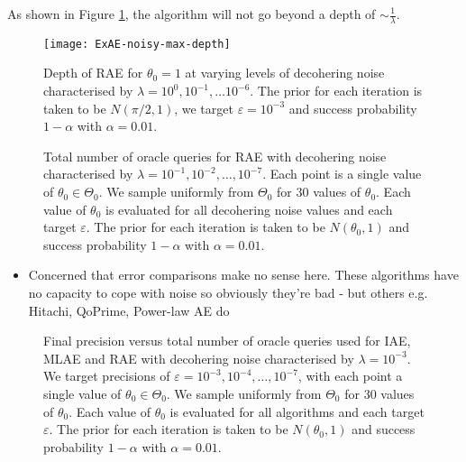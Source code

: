 As shown in Figure \ref{fig::ExAE-noisy-max-depth}, the algorithm will not go beyond a depth of $\sim \frac{1}{\lambda}$.

\begin{figure}[htbp]
	\centering
	\texttt{[image: ExAE-noisy-max-depth]}
	\caption{Depth of RAE for $\theta_0 = 1$ at varying levels of decohering noise characterised by $\lambda = 10^0, 10^{-1}, \ldots 10^{-6}$. The prior for each iteration is taken to be $N(\pi /2, 1)$, we target $\varepsilon = 10^{-3}$ and success probability $1 - \alpha$ with $\alpha = 0.01$.}
	\label{fig::ExAE-noisy-max-depth}
\end{figure}

\begin{figure}[htbp]
	\centering
	\missingfigure{}
	\caption{Total number of oracle queries for RAE with decohering noise characterised by $\lambda = 10^{-1}, 10^{-2}, \ldots, 10^{-7}$. Each point is a single value of $\theta_0 \in \Theta_0$. We sample uniformly from $\Theta_0$ for 30 values of $\theta_0$. Each value of $\theta_0$ is evaluated for all decohering noise values and each target $\varepsilon$. The prior for each iteration is taken to be $N(\theta_0, 1)$ and success probability $1 - \alpha$ with $\alpha = 0.01$.}
	\label{fig::query-exae-noisy}
\end{figure}

\begin{itemize}
	\color{red}
	\item Concerned that error comparisons make no sense here. These algorithms have no capacity to cope with noise so obviously they're bad - but others e.g. Hitachi, QoPrime, Power-law AE do
\end{itemize}

\begin{figure}[htbp]
	\centering
	\missingfigure{}
	\caption{Final precision versus total number of oracle queries used for IAE, MLAE and RAE with decohering noise characterised by $\lambda = 10^{-3}$. We target precisions of $\varepsilon = 10^{-3}, 10^{-4}, \ldots , 10^{-7}$, with each point a single value of $\theta_0 \in \Theta_0$. We sample uniformly from $\Theta_0$ for 30 values of $\theta_0$. Each value of $\theta_0$ is evaluated for all algorithms and each target $\varepsilon$. The prior for each iteration is taken to be $N(\theta_0, 1)$ and success probability $1 - \alpha$ with $\alpha = 0.01$.}
	\label{fig::query-comparison-noisy}
\end{figure}

\newpage



